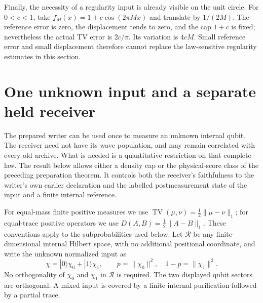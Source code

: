 \documentclass[11pt]{article}
\numberwithin{equation}{section}
\theoremstyle{definition}
\theoremstyle{remark}
\begin{document}
Finally, the necessity of a regularity input is already visible on the
unit circle. For $0<c<1$, take
$f_M(x)=1+c\cos(2\pi Mx)$ and translate by $1/(2M)$. The reference error
is zero, the displacement tends to zero, and the cap $1+c$ is fixed;
nevertheless the actual TV error is $2c/\pi$. Its variation is $4cM$.
Small reference error and small displacement therefore cannot replace
the law-sensitive regularity estimates in this section.


\section{One unknown input and a separate held receiver}
\label{p1i:sec:instrument}

The prepared writer can be used once to measure an unknown internal qubit.
The receiver need not have its wave population, and may remain correlated with
every old archive. What is needed is a quantitative restriction on that
complete law. The result below allows either a density cap or the physical-score
class of the preceding preparation theorem. It controls both the receiver's
faithfulness to the writer's own earlier declaration and the labelled
postmeasurement state of the input and a finite internal reference.

For equal-mass finite positive measures we use
$\operatorname{TV}(\mu,\nu)=\frac12\|\mu-\nu\|_1$; for equal-trace positive
operators we use $D(A,B)=\frac12\|A-B\|_1$. These conventions apply to the
subprobabilities used below. Let $\mathcal R$ be any finite-dimensional
internal Hilbert space, with no additional positional coordinate, and write
the unknown normalized input as
\begin{equation}\label{p1i:eq:input}
 \chi=|0\rangle\chi_0+|1\rangle\chi_1,
 \qquad p=\|\chi_0\|^2,\quad 1-p=\|\chi_1\|^2.
\end{equation}
No orthogonality of $\chi_0$ and $\chi_1$ in $\mathcal R$ is required.
The two displayed qubit sectors are orthogonal. A mixed input is covered by
a finite internal purification followed by a partial trace.
\end{document}

